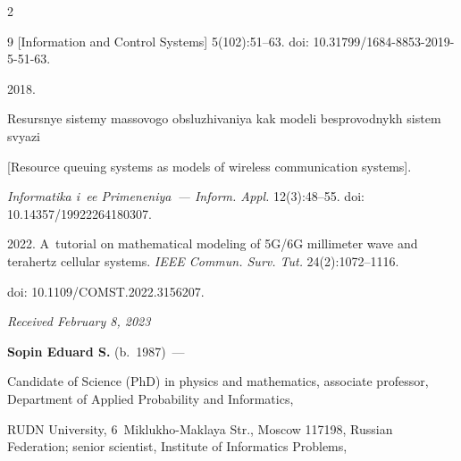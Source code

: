 \begin{multicols}{2}
{{\begin{thebibliography}{9}
 [Information and Control Systems] 5(102):51--63. doi: 10.31799/1684-8853-2019-5-\mbox{51-63}.




 2018. 

Re\-surs\-nye sis\-te\-my mas\-so\-vo\-go ob\-slu\-zhi\-va\-niya kak mo\-de\-li bes\-pro\-vod\-nykh sis\-tem svya\-zi 

[Resource queuing systems as models of wireless communication systems]. 

 \textit{Informatika i~ee Primeneniya~--- Inform. Appl.} 12(3):48--55. doi: 10.14357/19922264180307.





 2022. A~tutorial on mathematical modeling of 5G/6G millimeter wave and terahertz cellular systems. \textit{IEEE Commun. Surv. Tut.} 24(2):1072--1116. 

 doi: 10.1109/COMST.2022.3156207.





\end{thebibliography}



 }

 }



\end{multicols}



\vspace*{-9pt}



\hfill{\small\textit{Received February 8, 2023}} 



\Contr





\noindent

\textbf{Sopin Eduard S.} (b.\ 1987)~--- 

Candidate of Science (PhD) in physics and mathematics, associate professor, Department of Applied Probability and Informatics, 

RUDN University, 6~Miklukho-Maklaya Str., Moscow 117198, Russian Federation; senior scientist, Institute of Informatics Problems, 

